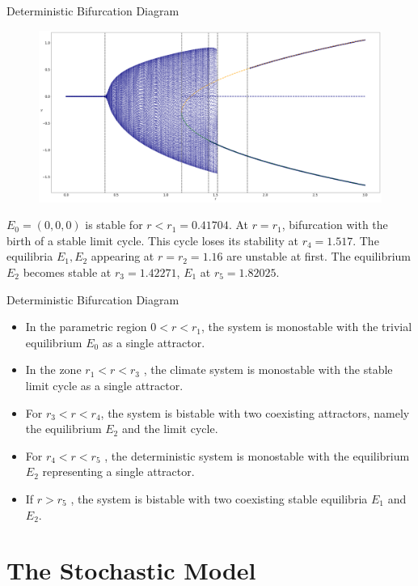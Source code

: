 \documentclass[10pt]{beamer}
\begin{document}
\begin{frame}{Deterministic Bifurcation Diagram}
	\begin{figure}
	\includegraphics[width=\textwidth, height=\textheight,keepaspectratio]{figures_2/noiseless-phase-portrait.png}
	\end{figure}
	
	$E_0 = (0, 0, 0)$ is stable for $r < r_1 = 0.41704$. 
	At $r = r_1$, bifurcation with the birth of a stable limit cycle.
	This cycle loses its stability at $r_4 = 1.517$. 
	The equilibria $E_1, E_2$ appearing at $r = r_2 = 1.16$ are unstable at ﬁrst. 
	The equilibrium $E_2$ becomes stable at $r_3 = 1.42271$, $E_1$ at $r_5 = 1.82025$.
\end{frame}

\begin{frame}{Deterministic Bifurcation Diagram}
	\begin{itemize}
		\item In the parametric region $0 < r < r_1$, the system is monostable with the trivial equilibrium $E_0$ as a single attractor. 
		\item In the zone $r_1 < r < r_3$ , the climate system is monostable with the stable limit cycle as a single attractor. 
		\item For $r_3 < r < r_4$, the system is bistable with two coexisting attractors, namely the equilibrium $E_2$ and the limit cycle. 
		\item For $r_4 < r < r_5$ , the deterministic system is monostable with the equilibrium $E_2$ representing a single attractor. 
		\item If $r > r_5$ , the system is bistable with two coexisting stable equilibria $E_1$ and $E_2$.
	\end{itemize}
\end{frame}



\section{The Stochastic Model}
\end{document}
